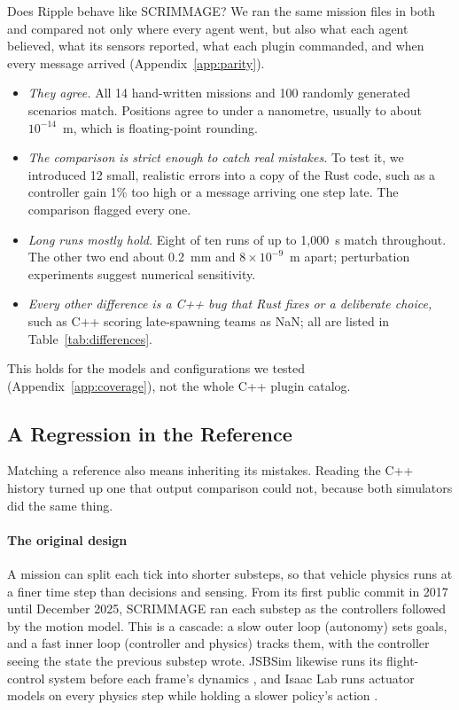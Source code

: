 \documentclass[conference]{IEEEtran}
\begin{document}
Does Ripple behave like SCRIMMAGE? We ran the same mission files in both
and compared not only where every agent went, but also what each agent
believed, what its sensors reported, what each plugin commanded, and when every
message arrived (Appendix~\ref{app:parity}).
\begin{itemize}
\item \emph{They agree.} All 14 hand-written missions and 100 randomly
generated scenarios match. Positions agree to under a nanometre, usually to
about $10^{-14}$~m, which is floating-point rounding.
\item \emph{The comparison is strict enough to catch real mistakes.} To test
it, we introduced 12 small, realistic errors into a copy of the Rust code, such
as a controller gain 1\% too high or a message arriving one step late. The
comparison flagged every one.
\item \emph{Long runs mostly hold.} Eight of ten runs of up to 1{,}000~s
match throughout. The other two end about 0.2~mm and $8\times10^{-9}$~m apart;
perturbation experiments suggest numerical sensitivity.
\item \emph{Every other difference is a C++ bug that Rust fixes or a
deliberate choice,} such as C++ scoring late-spawning teams as NaN; all are
listed in Table~\ref{tab:differences}.
\end{itemize}
This holds for the models and configurations we tested
(Appendix~\ref{app:coverage}), not the whole C++ plugin catalog.

\subsection{A Regression in the Reference}
\label{sec:substeps}

Matching a reference also means inheriting its mistakes. Reading the C++
history turned up one that output comparison could not, because both
simulators did the same thing.

\paragraph{The original design}
A mission can split each tick into shorter substeps, so that vehicle physics
runs at a finer time step than decisions and sensing. From its first public
commit in 2017 until December 2025, SCRIMMAGE ran each substep as the
controllers followed by the motion model. This is a cascade: a slow outer loop
(autonomy) sets goals, and a fast inner loop (controller and physics) tracks
them, with the controller seeing the state the previous substep wrote. JSBSim
likewise runs its flight-control system before each frame's dynamics
\cite{berndt2004jsbsim}, and Isaac Lab runs actuator models on every physics
step while holding a slower policy's action \cite{mittal2025isaaclab}.
\end{document}
